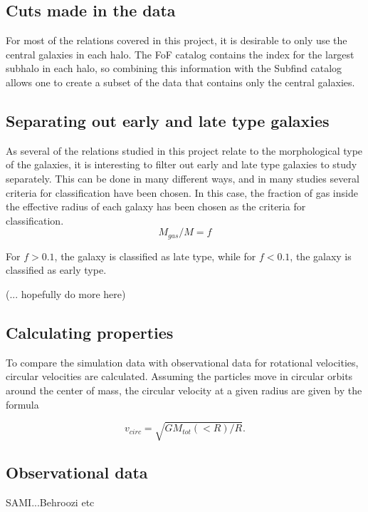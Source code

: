 \subsection{Cuts made in the data} %

For most of the relations covered in this project, it is desirable to only use the central galaxies in each halo. The FoF catalog contains the index for the largest subhalo in each halo, so combining this information with the Subfind catalog allows one to create a subset of the data that contains only the central galaxies.

\subsection{Separating out early and late type galaxies}
As several of the relations studied in this project relate to the morphological type of the galaxies, it is interesting to filter out early and late type galaxies to study separately. This can be done in many different ways, and in many studies several criteria for classification have been chosen. In this case, the fraction of gas inside the effective radius of each galaxy has been chosen as the criteria for classification.
\begin{equation}
    M_{gas}/M  = f
\end{equation}

For $f > 0.1$, the galaxy is classified as late type, while for $f< 0.1$, the galaxy is classified as early type.

(... hopefully do more here)

\subsection{Calculating properties}
To compare the simulation data with observational data for rotational velocities, circular velocities are calculated. Assuming the particles move in circular orbits around the center of mass, the circular velocity at a given radius are given by the formula

\begin{equation}
    v_{circ} = \sqrt{GM_{tot}(<R)/R}. 
\end{equation}

\subsection{Observational data}
SAMI...Behroozi etc